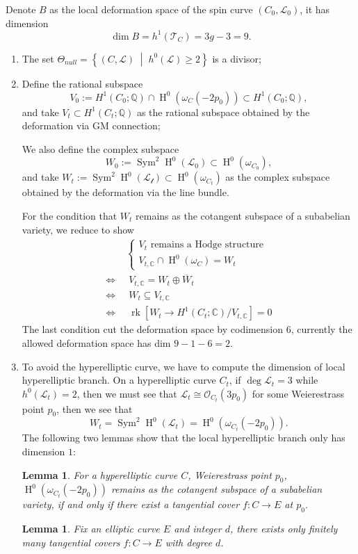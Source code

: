 \documentclass[UTF8]{amsart}
\numberwithin{equation}{section}
\theoremstyle{plain}
\newtheorem{lemma}[theorem]{Lemma}
\numberwithin{equation}{section}
\theoremstyle{remark}
\DeclareMathOperator{\Sym}{\operatorname{Sym}}
\DeclareMathOperator{\rk}{\operatorname{rk}}
\DeclareMathOperator{\Hnm}{\operatorname{H}}
\begin{document}
Denote $B$ as the local deformation space of the spin curve $(C_0,\mathcal{L}_0)$, it has dimension
$$\dim B = h^1(\mathcal{T}_C)=3g-3=9.$$
\begin{enumerate}
\item The set $\Theta_{null}= \left\{ (C,\mathcal{L}) \;\middle|\; h^0(\mathcal{L}) \geqslant 2 \right\}$ is a divisor;
\item Define the rational subspace
$$V_0:= H^1(C_0;\mathbb{Q}) \cap \Hnm^0\left(\omega_C(-2p_0)\right) \subset H^1(C_0;\mathbb{Q}),$$
and take $V_t \subset H^1(C_t;\mathbb{Q})$ as the rational subspace obtained by the deformation via GM connection;

We also define the complex subspace 
$$W_0:=\Sym^2 \Hnm^0(\mathcal{L_0}) \subset \Hnm^0(\omega_{C_0}),$$
and take $W_t:=\Sym^2 \Hnm^0(\mathcal{L_t})\subset \Hnm^0(\omega_{C_t})$ as the complex subspace obtained by the deformation via the line bundle.

For the condition that $W_t$ remains as the cotangent subspace of a subabelian variety, we reduce to show
\begin{equation*}
\begin{aligned}
   & \begin{cases}
   V_t \text{ remains a Hodge structure}\\
   V_{t,\mathbb{C}} \cap \Hnm^0(\omega_C)=W_t
   \end{cases} \\ 
  \Longleftrightarrow\;& \;V_{t,\mathbb{C}} = W_t \oplus \overline{W}_t  \\ 
  \Longleftrightarrow\;& \; W_t \subseteq V_{t,\mathbb{C}}\\
  \Longleftrightarrow\;& \; \rk \left[W_t \longrightarrow H^1(C_t;\mathbb{C})/ V_{t,\mathbb{C}}\right] =0
\end{aligned}
\end{equation*}
The last condition cut the deformation space by codimension $6$, currently the allowed deformation space has dim $9-1-6=2$.

\item To avoid the hyperelliptic curve, we have to compute the dimension of local hyperelliptic branch. On a hyperelliptic curve $C_t$, if $\deg \mathcal{L}_t=3$ while $h^0 (\mathcal{L}_t)=2$, then we must see that $\mathcal{L}_t \cong \mathcal{O}_{C_t}(3p_0)$ for some Weierestrass point $p_0$, then we see that 
$$W_t= \Sym^2 \Hnm^0(\mathcal{L}_t) = \Hnm^0\left(\omega_{C_t}(-2p_0)\right).$$
The following two lemmas show that the local hyperelliptic branch only has dimension $1$:
\begin{lemma}
For a hyperelliptic curve $C$, Weierestrass point $p_0$, 
$\Hnm^0\left(\omega_{C_t}(-2p_0)\right)$ remains as the cotangent subspace of a subabelian variety, if and only if there exist a tangential cover $f:C \longrightarrow E$ at $p_0$.
\end{lemma}
\begin{lemma}\cite[Proposition 2.5, 3]{treibich2025}
Fix an elliptic curve $E$ and integer $d$, there exists only finitely many tangential covers $f:C \longrightarrow E$ with degree $d$.
\end{lemma}
\end{enumerate}
\end{document}
